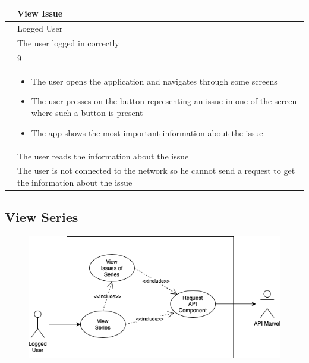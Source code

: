 {{{{\renewcommand{\arraystretch}{2}
{\begin{center}
\begin{tabular}{ | m{4cm} | m{9cm} | } 
 \hline
 {\centering{\textbf{Name}}} & View Issue \\
 \hline
 {\centering{\textbf{Actor}}} & Logged User \\
 \hline
 {\centering{\textbf{Entry Condition}}} & The user logged in correctly \\
 \hline
 {\centering{\textbf{Goal}}} & 9 \\
 \hline
 {\centering{\textbf{Event flow}}} & \begin{itemize}[leftmargin=*]
 	\item The user opens the application and navigates through some screens
	\item The user presses on the button representing an issue in one of the screen where such a button is present
	\item The app shows the most important information about the issue
	\end{itemize} \\	
 \hline
 {\centering{\textbf{Exit condition}}} & The user reads the information about the issue \\
 \hline
 {\centering{\textbf{Exceptions}}} & The user is not connected to the network so he cannot send a request to get the information about the issue \\
 \hline
\end{tabular}
\end{center}}

\clearpage

\subsection{View Series}
\begin{figure}[h]
\centering
\includegraphics[width=\textwidth]{img/usecases/viewseries}
\end{figure}

}}}}
